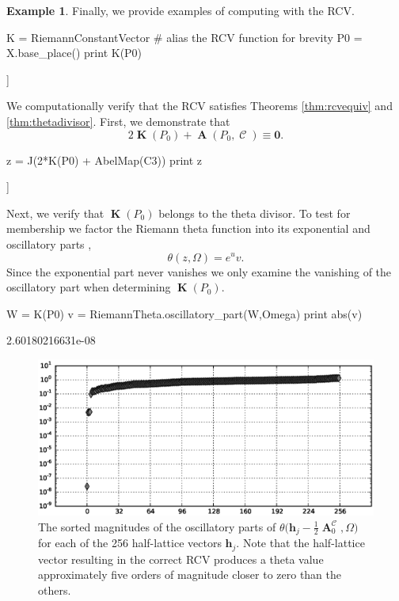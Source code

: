 \documentclass[12pt]{article}
\theoremstyle{definition}
\newtheorem{example}[theorem]{Example}
\DeclareMathOperator{\DivC}{\mathcal{C}}
\DeclareMathOperator{\RCV}{\boldsymbol{K}}
\DeclareMathOperator{\Abel}{\boldsymbol{A}}
\begin{document}
\begin{example}
Finally, we provide examples of computing with the RCV.
\begin{ipythoninput}
K = RiemannConstantVector   # alias the RCV function for brevity
P0 = X.base_place()
print K(P0)
\end{ipythoninput}
\begin{ipythonoutput}
[[ 0.8488+0.7203j -0.5941-0.1146j -0.7432+0.8913j -0.8189+1.1381j]]
\end{ipythonoutput}
We computationally verify that the RCV satisfies Theorems
\ref{thm:rcvequiv} and \ref{thm:thetadivisor}. First, we demonstrate
that
\begin{equation}
  2\RCV(P_0) + \Abel(P_0,\DivC) \equiv \boldsymbol{0}.
\end{equation}
\begin{ipythoninput}
z = J(2*K(P0) + AbelMap(C3))
print z
\end{ipythoninput}
\begin{ipythonoutput}
[[ 0.+0.j  0.+0.j -0.-0.j -0.-0.j]]
\end{ipythonoutput}
Next, we verify that $\RCV(P_0)$ belongs to the theta divisor. To test
for membership we factor the Riemann theta function into its exponential
and oscillatory parts \cite{NIST:DLMF,DHBvHS03},
\begin{equation}
  \theta(z,\Omega) = e^u v.
\end{equation}
Since the exponential part never vanishes we only examine the vanishing
of the oscillatory part when determining $\RCV(P_0)$.
\begin{ipythoninput}
W = K(P0)
v = RiemannTheta.oscillatory_part(W,Omega)
print abs(v)
\end{ipythoninput}
\begin{ipythonoutput}
2.60180216631e-08
\end{ipythonoutput}


\begin{figure}
  \centering
  \includegraphics[width=\textwidth]{oscvalues.eps}
  \caption{The sorted magnitudes of the oscillatory parts of
    $\theta\big( \boldsymbol{h}_j - \tfrac{1}{2}\Abel_0^{\DivC}, \Omega
    \big)$ for each of the 256 half-lattice vectors
    $\boldsymbol{h}_j$. Note that the half-lattice vector resulting in
    the correct RCV produces a theta value approximately five orders of
    magnitude closer to zero than the others.}
  \label{fig:oscvalues}
\end{figure}


\end{example}
\end{document}

